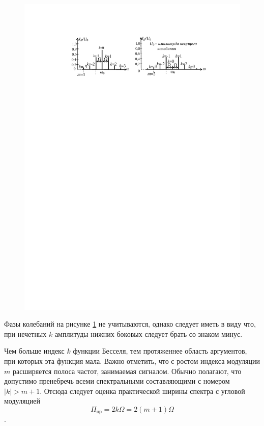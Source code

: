 \documentclass[a4paper,12pt]{article}
\begin{document}
\begin{figure}[H]
	\centering
	\includegraphics[]{fig/fig2-6}
	\caption{}
	\label{fig:2.6}
\end{figure}
Фазы колебаний на рисунке \ref{fig:2.6} не учитываются, однако следует иметь в виду что, при нечетных $k$ амплитуды нижних боковых следует брать со знаком минус. 

Чем больше индекс $k$ функции Бесселя, тем протяженнее область аргументов, при которых эта функция мала. Важно отметить, что с ростом индекса модуляции $m$ расширяется полоса частот, занимаемая сигналом. Обычно полагают, что допустимо пренебречь всеми спектральными составляющими с номером $|k|>m+1$. Отсюда следует оценка практической ширины спектра с угловой модуляцией 
\begin{equation}
	\Pi_\text{пр}=2k\Omega=2(m+1)\Omega
	\label{eq:ocenka}
\end{equation}.
\end{document}
